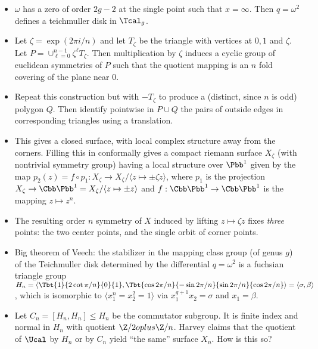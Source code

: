 \documentclass[11pt]{amsart}
\begin{document}
\begin{itemize}
  		\item $\omega$ has a zero of order $2g-2$ at the single point such that $x=\infty$. Then $q= \omega^2$ defines a teichmuller disk in $\Tcal_g$. 
  		\item Let $\zeta = \exp( 2\pi i /n)$ and let $T_\zeta$ be the triangle with vertices at $0,1$ and $\zeta$. Let $P=\cup_{\ell=0}^{n-1} \zeta ^\ell T_\zeta$. Then multiplication by $\zeta$ induces a cyclic group of euclidean symmetries of $P$ such that the 	quotient mapping is an $n$ fold covering of the plane near $0$. 
  		\item Repeat this construction but with $-T_\zeta$ to produce a (distinct, since $n$ is odd) polygon $Q$. Then identify pointwise in $P\cup Q$ the pairs of outside edges in corresponding triangles using a translation. 
  		\item This gives a closed surface, with local complex structure away from the corners. Filling this in conformally gives a compact riemann surface $X_\zeta$ (with nontrivial symmetry group) having a local structure over $\Pbb^1$ given by the map $p_2(z)=f\circ p_1:X_\zeta \to X_\zeta /\langle z \mapsto \pm \zeta z\rangle $, where $p_1$ is the projection $X_\zeta \to \Cbb \Pbb^1 =X_\zeta / \langle z \mapsto \pm z\rangle $   and $f : \Cbb \Pbb^1  \to \Cbb \Pbb^1$ is the mapping $z\mapsto z^n$. 
  		\item The resulting order $n$ symmetry of $X$ induced by lifting $z\mapsto \zeta z$ fixes \emph{three} points: the two center points, and the single orbit of corner points. 
  		\item Big theorem of Veech: the stabilizer in the mapping class group (of genus $g$) of the Teichmuller disk determined by the differential $q=\omega^2$ is a fuchsian triangle group $H_n = \langle \Tbt{1}{2\cot \pi/n}{0}{1}, \Tbt{\cos 2\pi/n}{-\sin 2\pi /n}{\sin 2\pi /n}{\cos 2\pi/n} \rangle = \langle \sigma , \beta\rangle $, which is isomorphic to $\langle x_1^n= x_2^2=1\rangle$ via $x_1^{g+1} x_2 =\sigma$ and $x_1=\beta$. 
  		\item Let $C_n=\left[ H_n, H_n \right] \leq H_n$ be the commutator subgroup. It is finite index and normal in $H_n$ with quotient $\Z/2 oplus \Z/n$. Harvey claims that the quotient of $\Ucal$ by $H_n$ or by $C_n$ yield ``the same'' surface $X_n$. How is this so? 
	\end{itemize}
\end{document}

